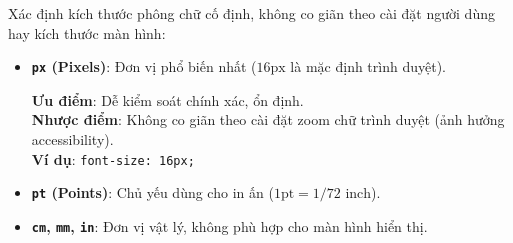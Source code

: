 \documentclass[11pt,oneside]{book}
\newcommand{\codeinline}[1]{\textcolor{accentOrange}{\texttt{#1}}}
\begin{document}
\begin{conceptBox}
Xác định kích thước phông chữ cố định, không co giãn theo cài đặt người dùng hay kích thước màn hình:
\begin{itemize}[leftmargin=1.5em, itemsep=4pt, parsep=0pt]
    \item \textbf{\codeinline{px} (Pixels)}: Đơn vị phổ biến nhất ($16\text{px}$ là mặc định trình duyệt).
    \begin{tcolorbox}[arc=3pt, colback=white, colframe=primaryBlue!20, boxrule=0.5pt, top=4pt, bottom=4pt, left=8pt, right=8pt]
      \textcolor{green!60!black}{\textbf{Ưu điểm}}: Dễ kiểm soát chính xác, ổn định. \\
      \textcolor{red!80!black}{\textbf{Nhược điểm}}: Không co giãn theo cài đặt zoom chữ trình duyệt (ảnh hưởng accessibility). \\
      \textbf{Ví dụ}: \codeinline{font-size: 16px;}
    \end{tcolorbox}
    \item \textbf{\codeinline{pt} (Points)}: Chủ yếu dùng cho in ấn ($1\text{pt} = 1/72\text{ inch}$).
    \item \textbf{\codeinline{cm}, \codeinline{mm}, \codeinline{in}}: Đơn vị vật lý, không phù hợp cho màn hình hiển thị.
\end{itemize}
\end{conceptBox}
\end{document}
